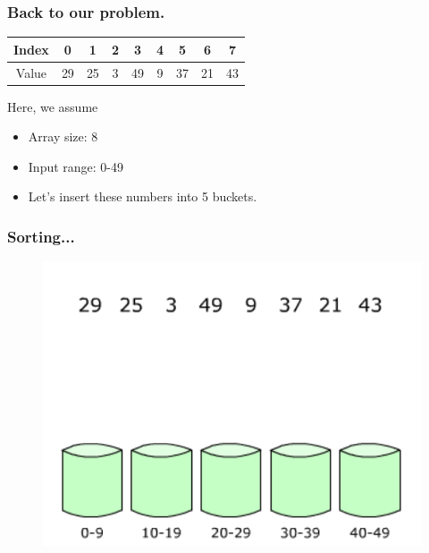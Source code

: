 \documentclass[pdf]{beamer}
\begin{document}
\begin{frame}
	\frametitle{Back to our problem.}
		\begin{table}[h]
			\centering
			\begin{tabular}{|c|c|c|c|c|c|c|c|c|}
				\hline
				Index & 0 & 1 & 2 & 3 & 4 & 5 & 6 & 7 \\
				\hline
				Value & 29 & 25 & 3 & 49 & 9 & 37 & 21 & 43\\
				\hline
			\end{tabular}
		\end{table}
		\pause
		Here, we assume
		\begin{itemize}
			\item Array size: 8
			\item Input range: 0-49
			\item Let's insert these numbers into 5 buckets.
		\end{itemize}
\end{frame}

\begin{frame}
	\frametitle{Sorting...}
	\begin{figure}
		\includegraphics[scale=.3]{Figure/0.png}
	\end{figure}	
\end{frame}
\end{document}
